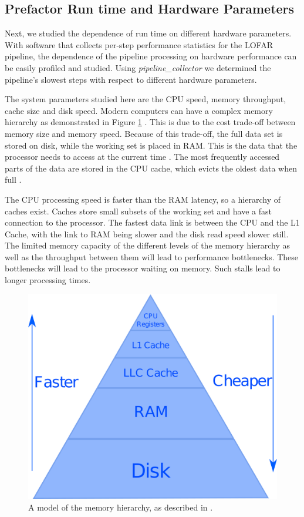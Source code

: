\subsection{Prefactor Run time and Hardware Parameters}\label{sec:ch4_res_tcoll}

Next, we studied the dependence of run time on different hardware parameters. With software that collects per-step performance statistics for the LOFAR pipeline, the dependence of the pipeline processing on hardware performance can be easily profiled and studied. Using \textit{pipeline\_collector} we determined the pipeline's slowest steps with respect to different hardware parameters. 

The system parameters studied here are the CPU speed, memory throughput, cache size and disk speed. Modern computers can have a complex memory hierarchy as demonstrated in Figure \ref{fig:ch4_mem_hiearch} \citep{mem_hiearch}. This is due to the cost trade-off between memory size and memory speed. Because of this trade-off, the full data set is stored on disk, while the working set is placed in RAM. This is the data that the processor needs to access at the current time \citep{workingset}. The most frequently accessed parts of the data are stored in the CPU cache, which evicts the oldest data when full \citep{cache_eviction}. 

The CPU processing speed is faster than the RAM latency, so a hierarchy of caches exist. Caches store small subsets of the working set and have a fast connection to the processor. The fastest data link is between the CPU and the L1 Cache, with the link to RAM being slower and the disk read speed slower still. The limited memory capacity of the different levels of the memory hierarchy  as well as the throughput between them will lead to performance bottlenecks. These bottlenecks will lead to the processor waiting on memory. Such stalls lead to longer processing times.

\begin{figure}[ht!]
  \centering
    \includegraphics[width=0.5\linewidth]{ch4/figures/fig6/pyramid.png}
      \caption{A model of the memory hierarchy, as described in \citep{goto2008anatomy}. }
	\label{fig:ch4_mem_hiearch}
\end{figure}


